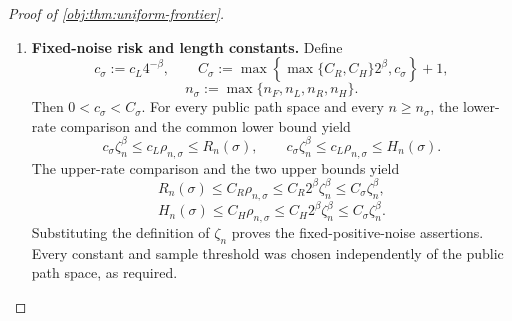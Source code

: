 \documentclass[11pt]{article}
\begin{document}
\begin{proof}[Proof of \cref{obj:thm:uniform-frontier}]
\begin{enumerate}
\item \textbf{Fixed-noise risk and length constants.}
Define
\[
c_\sigma:=c_L4^{-\beta},
\qquad
C_\sigma:=
\max\left\{\max\{C_R,C_H\}2^\beta,c_\sigma\right\}+1,
\]
\[
n_\sigma:=\max\{n_F,n_L,n_R,n_H\}.
\]
Then \(0<c_\sigma<C_\sigma\). For every public path space and every \(n\ge n_\sigma\), the lower-rate comparison and the common lower bound yield
\[
c_\sigma\zeta_n^\beta
\le c_L\rho_{n,\sigma}\le R_n(\sigma),
\qquad
c_\sigma\zeta_n^\beta
\le c_L\rho_{n,\sigma}\le H_n(\sigma).
\]
The upper-rate comparison and the two upper bounds yield
\[
R_n(\sigma)
\le C_R\rho_{n,\sigma}
\le C_R2^\beta\zeta_n^\beta
\le C_\sigma\zeta_n^\beta,
\]
\[
H_n(\sigma)
\le C_H\rho_{n,\sigma}
\le C_H2^\beta\zeta_n^\beta
\le C_\sigma\zeta_n^\beta.
\]
Substituting the definition of \(\zeta_n\) proves the fixed-positive-noise assertions. Every constant and sample threshold was chosen independently of the public path space, as required.
\end{enumerate}
\end{proof}
\end{document}
